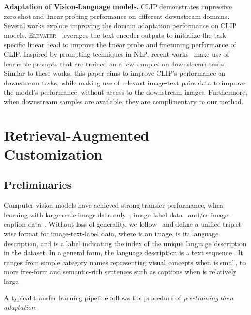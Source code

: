 \documentclass[10pt,twocolumn,letterpaper]{article}
\renewcommand{\paragraph}[1]{\vspace{1.25mm}\noindent\textbf{#1}}
\begin{document}
\paragraph{Adaptation of Vision-Language models.}
CLIP demonstrates impressive zero-shot and linear probing performance on different downstream domains.  Several works explore improving the domain adaptation performance on CLIP models.  \textsc{Elevater}~\cite{li2022elevater} leverages the text encoder outputs to initialize the task-specific linear head to improve the linear probe and finetuning performance of CLIP.  Inspired by prompting techniques in NLP, recent works~\cite{zhou2022learning,saito2022prefix} make use of learnable prompts that are trained on a few samples on downstream tasks.
Similar to these works, this paper aims to improve CLIP's performance on downstream tasks, while making use of relevant image-text pairs data to improve the model's performance, without access to the downstream images.  Furthermore, when downstream samples are available, they are complimentary to our method.

 \vspace{-2mm}
\section{Retrieval-Augmented Customization}
\label{sec:approach}
\vspace{-1mm}

\subsection{Preliminaries}
\label{sec:preliminaries}
\vspace{-1mm}
 Computer vision models have achieved strong transfer performance, when learning with large-scale image data only~\cite{he2020momentum}, image-label data~\cite{kolesnikov2020big} and/or image-caption data~\cite{radford2021learning,yang2022unicl,yuan2021florence}. Without loss of generality, we follow~\cite{yang2022unicl} and define a unified triplet-wise format  for image-text-label data, where   is an image,  is its  language description, and  is a label indicating the index of the unique language description in the dataset. In a general form, the language description is a text sequence . It ranges from simple category names representing visual concepts when  is small, to more free-form and  semantic-rich sentences such as captions when  is relatively large. 
 
A typical transfer learning pipeline follows the procedure of {\it pre-training then adaptation}:
 
\end{document}
